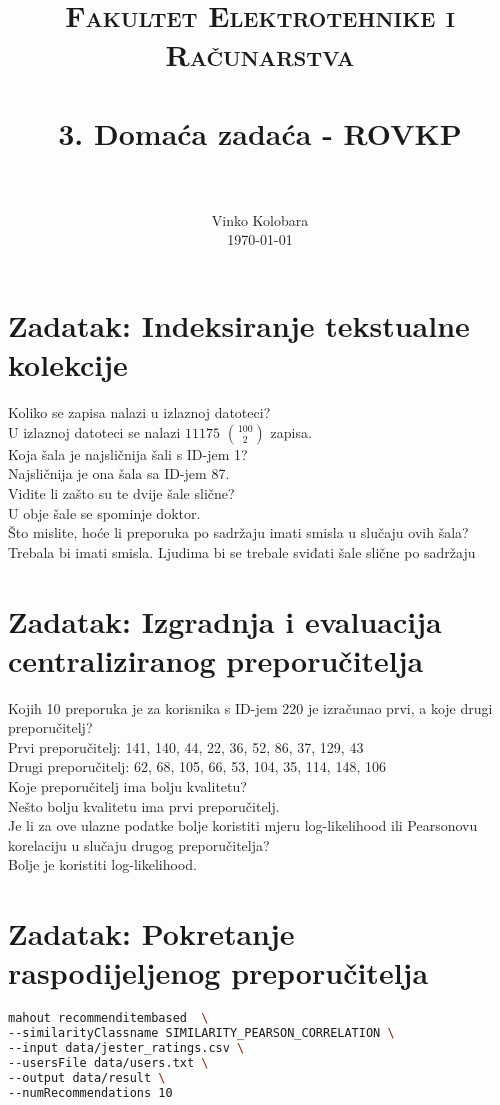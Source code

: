 \documentclass[paper=a4, fontsize=11pt]{scrartcl}
\title{
		\usefont{OT1}{bch}{b}{n}
		\normalfont \normalsize \textsc{Fakultet Elektrotehnike i Računarstva} \\ [25pt]
		\horrule{0.5pt} \\[0.4cm]
		\huge 3. Domaća zadaća - ROVKP \\
		\horrule{2pt} \\[0.5cm]
}
\author{
		\normalfont 								\normalsize
        Vinko Kolobara\\[-3pt]		\normalsize
        \today
}
\date{}
\numberwithin{equation}{section}		%
\numberwithin{figure}{section}			%
\numberwithin{table}{section}				%
\begin{document}
\maketitle

\section{Zadatak: Indeksiranje tekstualne kolekcije}
Koliko se zapisa nalazi u izlaznoj datoteci?\\
U izlaznoj datoteci se nalazi $11175$ $100 \choose 2$ zapisa.\\

Koja šala je najsličnija šali s ID-jem 1?\\
Najsličnija je ona šala sa ID-jem 87.\\

Vidite li zašto su te dvije šale slične?\\
U obje šale se spominje doktor.\\

Što mislite, hoće li preporuka po sadržaju imati smisla u slučaju ovih šala?\\
Trebala bi imati smisla. Ljudima bi se trebale sviđati šale slične po sadržaju\\


\pagebreak

\section{Zadatak: Izgradnja i evaluacija centraliziranog preporučitelja}
Kojih 10 preporuka je za korisnika s ID-jem 220 je izračunao prvi, a koje drugi preporučitelj?\\
Prvi preporučitelj: 141, 140, 44, 22, 36, 52, 86, 37, 129, 43\\
Drugi preporučitelj: 62, 68, 105, 66, 53, 104, 35, 114, 148, 106\\

Koje preporučitelj ima bolju kvalitetu?\\
Nešto bolju kvalitetu ima prvi preporučitelj.\\

Je li za ove ulazne podatke bolje koristiti mjeru log-likelihood ili Pearsonovu korelaciju u slučaju drugog preporučitelja?\\
Bolje je koristiti log-likelihood.

\pagebreak

\section{Zadatak: Pokretanje raspodijeljenog preporučitelja}
\begin{lstlisting}[language=bash,caption={Pokretanje raspodijeljenog preporučitelja}]
mahout recommenditembased  \
--similarityClassname SIMILARITY_PEARSON_CORRELATION \
--input data/jester_ratings.csv \
--usersFile data/users.txt \
--output data/result \
--numRecommendations 10
\end{lstlisting}
\end{document}

